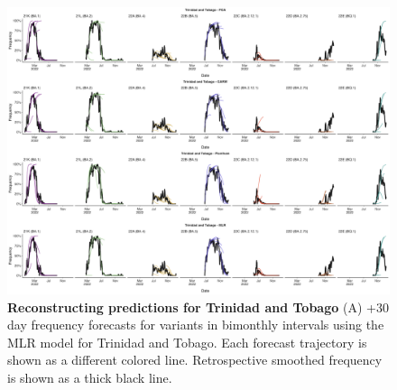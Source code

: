 \begin{figure}[th!]
	\centering
	\includegraphics[width=0.9\textwidth=0.01]{supp_figures/supplementary_fig_Trinidad and Tobago.png}
	\caption{
		\textbf{Reconstructing predictions for Trinidad and Tobago}
		(A) +30 day frequency forecasts for variants in bimonthly intervals using the MLR model for Trinidad and Tobago.
		Each forecast trajectory is shown as a different colored line.
		Retrospective smoothed frequency is shown as a thick black line.
	}
	\label{fig:S5}
\end{figure}


